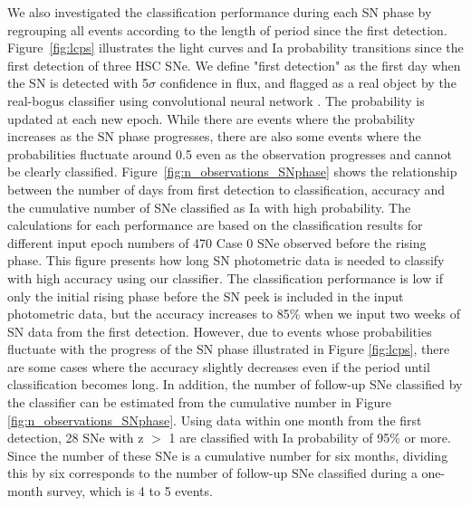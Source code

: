 \documentclass[useamsfonts]{pasj01}
\begin{document}
We also investigated the classification performance during each SN phase by regrouping all events according to the length of period since the first detection.
Figure\ \ref{fig:lcps} illustrates the light curves and Ia probability transitions since the first detection of three HSC SNe.
We define "first detection" as the first day when the SN is detected with 5$\sigma$ confidence in flux, and flagged as a real object by the real-bogus classifier using convolutional neural network \citep{yasuda19a}.
The probability is updated at each new epoch.
While there are events where the probability increases as the SN phase progresses, there are also some events where the probabilities fluctuate around 0.5 even as the observation progresses and cannot be clearly classified.
Figure\ \ref{fig:n_observations_SNphase} shows the relationship between the number of days from first detection to classification, accuracy and the cumulative number of SNe classified as Ia with high probability.
The calculations for each performance are based on the classification results for different input epoch numbers of 470 Case 0 SNe observed before the rising phase.
This figure presents how long SN photometric data is needed to classify with high accuracy using our classifier.
The classification performance is low if only the initial rising phase before the SN peek is included in the input photometric data, but the accuracy increases to 85\% when we input two weeks of SN data from the first detection.
However, due to events whose probabilities fluctuate with the progress of the SN phase illustrated in Figure \ref{fig:lcps}, there are some cases where the accuracy slightly decreases even if the period until classification becomes long.
In addition, the number of follow-up SNe classified by the classifier can be estimated from the cumulative number in Figure \ref{fig:n_observations_SNphase}.
Using data within one month from the first detection, 28 SNe with z $>$ 1 are classified with Ia probability of 95\% or more.
Since the number of these SNe is a cumulative number for six months, dividing this by six corresponds to the number of follow-up SNe classified during a one-month survey, which is 4 to 5 events.
\end{document}
